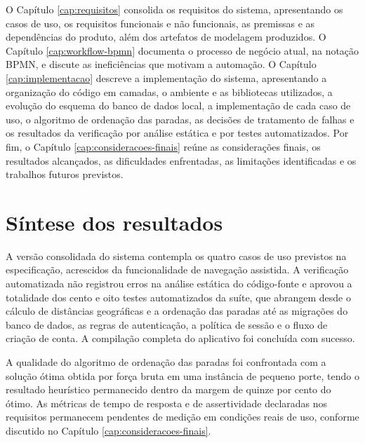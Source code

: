 O Capítulo \ref{cap:requisitos} consolida os requisitos do sistema, apresentando os casos de uso, os requisitos funcionais e não funcionais, as premissas e as dependências do produto, além dos artefatos de modelagem produzidos. O Capítulo \ref{cap:workflow-bpmn} documenta o processo de negócio atual, na notação BPMN, e discute as ineficiências que motivam a automação. O Capítulo \ref{cap:implementacao} descreve a implementação do sistema, apresentando a organização do código em camadas, o ambiente e as bibliotecas utilizados, a evolução do esquema do banco de dados local, a implementação de cada caso de uso, o algoritmo de ordenação das paradas, as decisões de tratamento de falhas e os resultados da verificação por análise estática e por testes automatizados. Por fim, o Capítulo \ref{cap:consideracoes-finais} reúne as considerações finais, os resultados alcançados, as dificuldades enfrentadas, as limitações identificadas e os trabalhos futuros previstos.

\section{Síntese dos resultados}

A versão consolidada do sistema contempla os quatro casos de uso previstos na especificação, acrescidos da funcionalidade de navegação assistida. A verificação automatizada não registrou erros na análise estática do código-fonte e aprovou a totalidade dos cento e oito testes automatizados da suíte, que abrangem desde o cálculo de distâncias geográficas e a ordenação das paradas até as migrações do banco de dados, as regras de autenticação, a política de sessão e o fluxo de criação de conta. A compilação completa do aplicativo foi concluída com sucesso.

A qualidade do algoritmo de ordenação das paradas foi confrontada com a solução ótima obtida por força bruta em uma instância de pequeno porte, tendo o resultado heurístico permanecido dentro da margem de quinze por cento do ótimo. As métricas de tempo de resposta e de assertividade declaradas nos requisitos permanecem pendentes de medição em condições reais de uso, conforme discutido no Capítulo \ref{cap:consideracoes-finais}.
